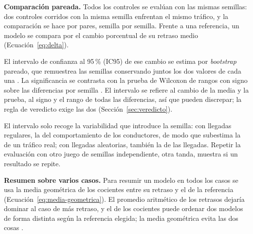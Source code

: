 \noindent\textbf{Comparación pareada.} Todos los controles se evalúan con las mismas semillas: dos
controles corridos con la misma semilla enfrentan el mismo tráfico, y la comparación se hace por
pares, semilla por semilla. Frente a una referencia, un modelo se compara por el cambio porcentual
de su retraso medio (Ecuación~\ref{eq:delta}).

El intervalo de confianza al 95\,\% (IC95) de ese cambio se estima por \textit{bootstrap} pareado,
que remuestrea las semillas conservando juntos los dos valores de cada una
\citep{Efron1993_Bootstrap}. La significancia se contrasta con la prueba de Wilcoxon de rangos con
signo sobre las diferencias por semilla \citep{Wilcoxon1945_Rangos}. El intervalo se refiere al
cambio de la media y la prueba, al signo y el rango de todas las diferencias, así que pueden
discrepar; la regla de veredicto exige las dos (Sección~\ref{sec:veredicto}).

El intervalo solo recoge la variabilidad que introduce la semilla: con llegadas regulares, la del
comportamiento de los conductores, de modo que subestima la de un tráfico real; con llegadas
aleatorias, también la de las llegadas. Repetir la evaluación con otro juego de semillas
independiente, otra tanda, muestra si un resultado se repite.

\noindent\textbf{Resumen sobre varios casos.} Para resumir un modelo en todos los casos se usa la
media geométrica de los cocientes entre su retraso y el de la referencia
(Ecuación~\ref{eq:media-geometrica}). El promedio aritmético de los retrasos dejaría dominar al
caso de más retraso, y el de los cocientes puede ordenar dos modelos de forma distinta según la
referencia elegida; la media geométrica evita las dos cosas \citep{Fleming1986_MediaGeometrica}.
